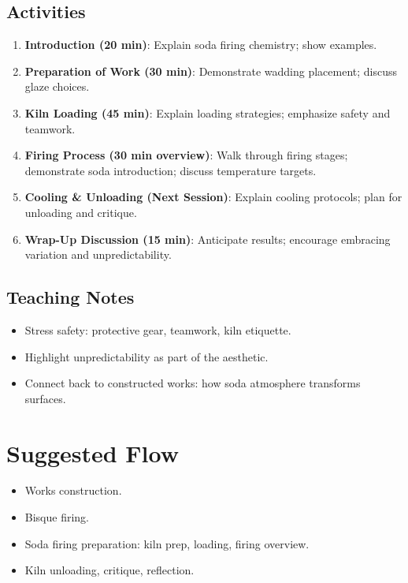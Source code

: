 \documentclass[12pt]{scrartcl}
\begin{document}
\subsection*{Activities}
\begin{enumerate}
  \item \textbf{Introduction (20 min)}: Explain soda firing chemistry; show examples.
  \item \textbf{Preparation of Work (30 min)}: Demonstrate wadding placement; discuss glaze choices.
  \item \textbf{Kiln Loading (45 min)}: Explain loading strategies; emphasize safety and teamwork.
  \item \textbf{Firing Process (30 min overview)}: Walk through firing stages; demonstrate soda introduction; discuss temperature targets.
  \item \textbf{Cooling \& Unloading (Next Session)}: Explain cooling protocols; plan for unloading and critique.
  \item \textbf{Wrap-Up Discussion (15 min)}: Anticipate results; encourage embracing variation and unpredictability.
\end{enumerate}

\subsection*{Teaching Notes}
\begin{itemize}
  \item Stress safety: protective gear, teamwork, kiln etiquette.
  \item Highlight unpredictability as part of the aesthetic.
  \item Connect back to constructed works: how soda atmosphere transforms surfaces.
\end{itemize}

\section*{Suggested Flow}
\begin{itemize}
  \item Works construction.
  \item Bisque firing.
  \item Soda firing preparation: kiln prep, loading, firing overview.
  \item Kiln unloading, critique, reflection.
\end{itemize}
\end{document}
